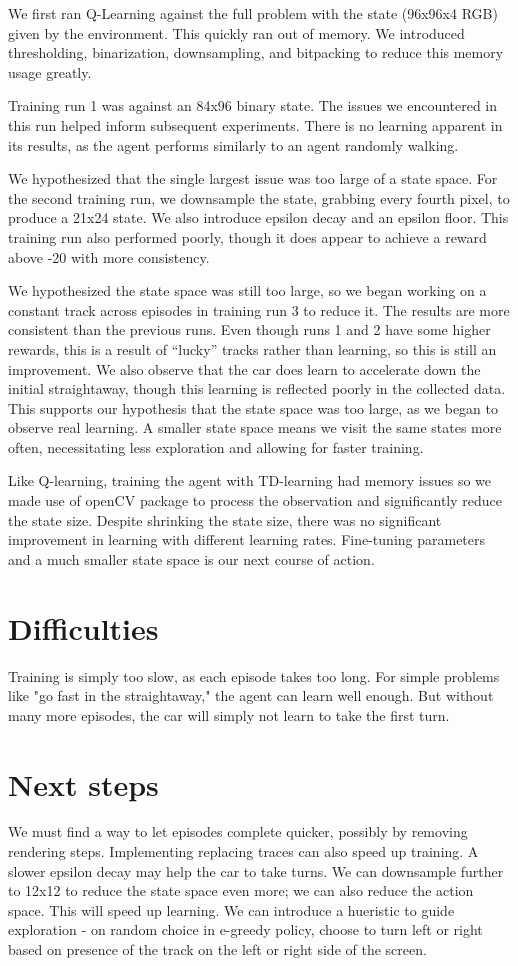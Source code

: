\documentclass{article}
\begin{document}
We first ran Q-Learning against the full problem with the state (96x96x4
RGB) given by the environment. This quickly ran out of memory. We
introduced thresholding, binarization, downsampling, and bitpacking to
reduce this memory usage greatly.

Training run 1 was against an 84x96 binary state. The issues we
encountered in this run helped inform subsequent experiments. There is
no learning apparent in its results, as the agent performs similarly to
an agent randomly walking.

We hypothesized that the single largest issue was too large of a state
space. For the second training run, we downsample the state, grabbing
every fourth pixel, to produce a 21x24 state. We also introduce epsilon
decay and an epsilon floor. This training run also performed poorly,
though it does appear to achieve a reward above -20 with more
consistency.

We hypothesized the state space was still too large, so we began working
on a constant track across episodes in training run 3 to reduce it. The
results are more consistent than the previous runs. Even though runs 1
and 2 have some higher rewards, this is a result of ``lucky'' tracks
rather than learning, so this is still an improvement. We also observe
that the car does learn to accelerate down the initial straightaway,
though this learning is reflected poorly in the collected data. This
supports our hypothesis that the state space was too large, as we began
to observe real learning.
A smaller state space means we visit the same states more often, necessitating less exploration and allowing for faster training.

Like Q-learning, training the agent with TD-learning had memory issues so we made use of openCV package to process the observation and significantly reduce the state size. Despite shrinking the state size, there was no significant improvement in learning with different learning rates. Fine-tuning parameters and a much smaller state space is our next course of action.

\section{Difficulties}

Training is simply too slow, as each episode takes too long.
For simple problems like "go fast in the straightaway," the agent can learn well enough.
But without many more episodes, the car will simply not learn to take the first turn.

\section{Next steps}

We must find a way to let episodes complete quicker, possibly by removing rendering steps. 
Implementing replacing traces can also speed up training. 
A slower epsilon decay may help the car to take turns.
We can downsample further to 12x12 to reduce the state space even more; we can also reduce the action space.
This will speed up learning.
We can introduce a hueristic to guide exploration - on random choice in e-greedy policy, choose to turn left or right based on presence of the track on the left or right side of the screen.
\end{document}
